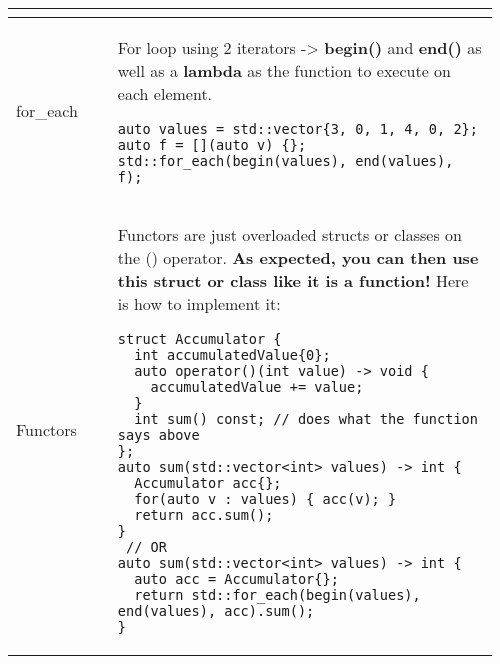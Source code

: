 \documentclass[main.tex,fontsize=8pt,paper=a4,paper=portrait,DIV=calc]{scrartcl}
\begin{document}
\begin{table}[ht!]
\begin{tabular}{|m{0.2\linewidth}|m{0.755\linewidth}|}
\begin{itemize}
\vspace{-3mm}
\end{itemize} 
\\
\hline
for\_each & 
For loop using 2 iterators -> \textbf{begin()} and \textbf{end()} as well as a \textbf{lambda} as the function to execute on each element.\newline
\begin{lstlisting}
auto values = std::vector{3, 0, 1, 4, 0, 2};
auto f = [](auto v) {};
std::for_each(begin(values), end(values), f);
\end{lstlisting}\\
\hline
Functors & 
Functors are just overloaded structs or classes on the () operator.\newline
\textbf{As expected, you can then use this struct or class like it is a function!}\newline
Here is how to implement it:\newline 
\begin{lstlisting}
struct Accumulator {
  int accumulatedValue{0};
  auto operator()(int value) -> void {
    accumulatedValue += value;
  }
  int sum() const; // does what the function says above
};
auto sum(std::vector<int> values) -> int {
  Accumulator acc{};
  for(auto v : values) { acc(v); }
  return acc.sum();
}
 // OR
auto sum(std::vector<int> values) -> int {
  auto acc = Accumulator{};
  return std::for_each(begin(values), end(values), acc).sum();
}
\end{lstlisting}\\
\hline
\end{tabular}
\end{table}
\pagebreak
\end{document}
